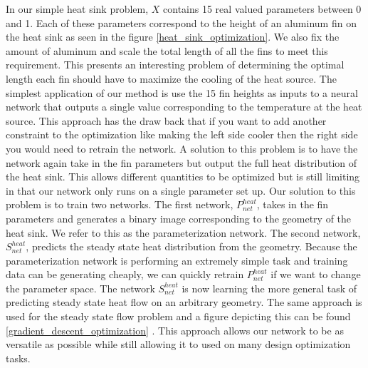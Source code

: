 \documentclass{article} %
\begin{document}
In our simple heat sink problem, $X$ contains 15 real valued parameters between 0 and 1. Each of these parameters correspond to the height of an aluminum fin on the heat sink as seen in the figure \ref{heat_sink_optimization}. We also fix the amount of aluminum and scale the total length of all the fins to meet this requirement. This presents an interesting problem of determining the optimal length each fin should have to maximize the cooling of the heat source. The simplest application of our method is use the 15 fin heights as inputs to a neural network that outputs a single value corresponding to the temperature at the heat source. This approach has the draw back that if you want to add another constraint to the optimization like making the left side cooler then the right side you would need to retrain the network. A solution to this problem is to have the network again take in the fin parameters but output the full heat distribution of the heat sink. This allows different quantities to be optimized but is still limiting in that our network only runs on a single parameter set up. Our solution to this problem is to train two networks. The first network, $P^{heat}_{net}$, takes in the fin parameters and generates a binary image corresponding to the geometry of the heat sink. We refer to this as the parameterization network. The second network, $S^{heat}_{net}$, predicts the steady state heat distribution from the geometry. Because the parameterization network is performing an extremely simple task and training data can be generating cheaply, we can quickly retrain $P^{heat}_{net}$ if we want to change the parameter space. The network $S^{heat}_{net}$ is now learning the more general task of predicting steady state heat flow on an arbitrary geometry. The same approach is used for the steady state flow problem and a figure depicting this can be found \ref{gradient_descent_optimization} . This approach allows our network to be as versatile as possible while still allowing it to used on many design optimization tasks.
\end{document}
